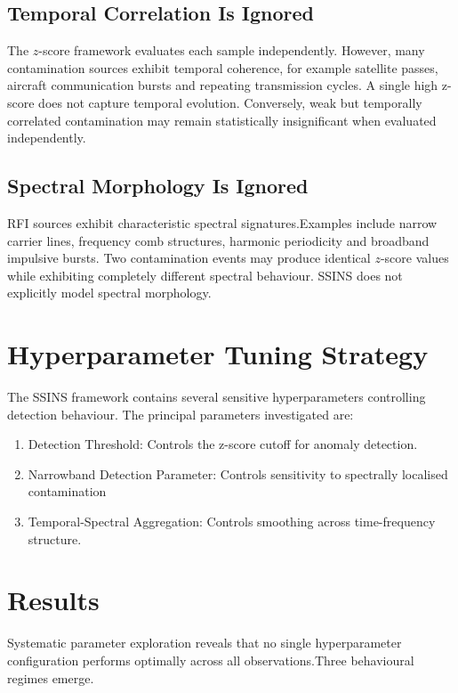 \documentclass{article}
\begin{document}
\subsection{Temporal Correlation Is Ignored}
The $z$-score framework evaluates each sample independently. However, many contamination sources exhibit temporal coherence, for example satellite passes, aircraft communication bursts and repeating transmission cycles. A single high z-score does not capture temporal evolution. Conversely, weak but temporally correlated contamination may remain statistically insignificant when evaluated independently.

\subsection{Spectral Morphology Is Ignored}
RFI sources exhibit characteristic spectral signatures.Examples include narrow carrier lines, frequency comb structures, harmonic periodicity
and broadband impulsive bursts. Two contamination events may produce identical $z$-score values while exhibiting completely different spectral behaviour. SSINS does not explicitly model spectral morphology.

\section{Hyperparameter Tuning Strategy}
The SSINS framework contains several sensitive hyperparameters controlling detection behaviour. The principal parameters investigated are:
\begin{enumerate}
\item Detection Threshold: Controls the z-score cutoff for anomaly detection.
\item Narrowband Detection Parameter: Controls sensitivity to spectrally localised contamination
\item Temporal-Spectral Aggregation: Controls smoothing across time-frequency structure.
\end{enumerate}
\section{Results}
Systematic parameter exploration reveals that no single hyperparameter configuration performs optimally across all observations.Three behavioural regimes emerge.
\end{document}
